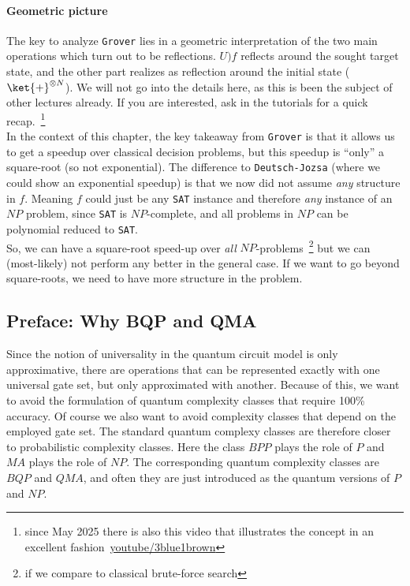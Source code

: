 \paragraph*{Geometric picture} The key to analyze \texttt{Grover} lies in a geometric interpretation of the two main operations which turn out to be reflections. $U)f$ reflects around the sought target state, and the other part realizes as reflection around the initial state ($\ket{+}^{\otimes N}$). We will not go into the details here, as this is been the subject of other lectures already. If you are interested, ask in the tutorials for a quick recap.~\footnote{since May 2025 there is also this video that illustrates the concept in an excellent fashion~\href{https://www.youtube.com/watch?v=RQWpF2Gb-gU}{youtube/3blue1brown}} \\


In the context of this chapter, the key takeaway from \texttt{Grover} is that it allows us to get a speedup over classical decision problems, but this speedup is ``only'' a square-root (so not exponential). The difference to \texttt{Deutsch-Jozsa} (where we could show an exponential speedup) is that we now did not assume \textit{any} structure in $f$. Meaning $f$ could just be any \texttt{SAT} instance and therefore \textit{any} instance of an $NP$ problem, since \texttt{SAT} is $NP$-complete, and all problems in $NP$ can be polynomial reduced to \texttt{SAT}.\\
So, we can have a square-root speed-up over \textit{all} $NP$-problems~\footnote{if we compare to classical brute-force search} but we can (most-likely) not perform any better in the general case. If we want to go beyond square-roots, we need to have more structure in the problem. 

\subsection{Preface: Why BQP and QMA}

Since the notion of universality in the quantum circuit model is only approximative, there are operations that can be represented exactly with one universal gate set, but only approximated with another. Because of this, we want to avoid the formulation of quantum complexity classes that require 100\% accuracy. Of course we also want to avoid complexity classes that depend on the employed gate set. The standard quantum complexy classes are therefore closer to probabilistic complexity classes. 
Here the class $BPP$ plays the role of $P$ and $MA$ plays the role of $NP$. The corresponding quantum complexity classes are $BQP$ and $QMA$, and often they are just introduced as the quantum versions of $P$ and $NP$.

